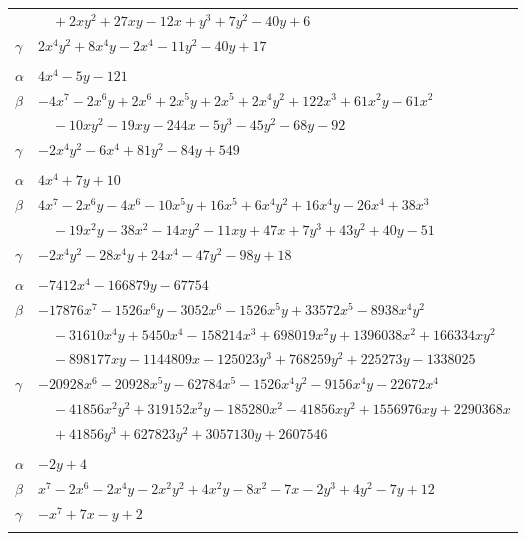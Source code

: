 \documentclass[11pt]{article}
\begin{document}
\begin{longtable}{@{}ll@{}}
 & $\quad +2xy^{2}+27xy-12x+y^{3}+7y^{2}-40y+6$\\
$\gamma$ & $2x^{4}y^{2}+8x^{4}y-2x^{4}-11y^{2}-40y+17$\\
\addlinespace[3pt]
\multicolumn{2}{@{}l}{$\{i,j\}=\{12,21\}$, $k_{ij}=2^{4}\cdot 3\cdot 7$}\\
$\alpha$ & $4x^{4}-5y-121$\\
$\beta$ & $-4x^{7}-2x^{6}y+2x^{6}+2x^{5}y+2x^{5}+2x^{4}y^{2}+122x^{3}+61x^{2}y-61x^{2}$\\
 & $\quad -10xy^{2}-19xy-244x-5y^{3}-45y^{2}-68y-92$\\
$\gamma$ & $-2x^{4}y^{2}-6x^{4}+81y^{2}-84y+549$\\
\addlinespace[3pt]
\multicolumn{2}{@{}l}{$\{i,j\}=\{13,17\}$, $k_{ij}=2^{4}\cdot 7$}\\
$\alpha$ & $4x^{4}+7y+10$\\
$\beta$ & $4x^{7}-2x^{6}y-4x^{6}-10x^{5}y+16x^{5}+6x^{4}y^{2}+16x^{4}y-26x^{4}+38x^{3}$\\
 & $\quad -19x^{2}y-38x^{2}-14xy^{2}-11xy+47x+7y^{3}+43y^{2}+40y-51$\\
$\gamma$ & $-2x^{4}y^{2}-28x^{4}y+24x^{4}-47y^{2}-98y+18$\\
\addlinespace[3pt]
\multicolumn{2}{@{}l}{$\{i,j\}=\{13,19\}$, $k_{ij}=2\cdot 3\cdot 5^{3}$}\\
$\alpha$ & $-7412x^{4}-166879y-67754$\\
$\beta$ & $-17876x^{7}-1526x^{6}y-3052x^{6}-1526x^{5}y+33572x^{5}-8938x^{4}y^{2}$\\
 & $\quad -31610x^{4}y+5450x^{4}-158214x^{3}+698019x^{2}y+1396038x^{2}+166334xy^{2}$\\
 & $\quad -898177xy-1144809x-125023y^{3}+768259y^{2}+225273y-1338025$\\
$\gamma$ & $-20928x^{6}-20928x^{5}y-62784x^{5}-1526x^{4}y^{2}-9156x^{4}y-22672x^{4}$\\
 & $\quad -41856x^{2}y^{2}+319152x^{2}y-185280x^{2}-41856xy^{2}+1556976xy+2290368x$\\
 & $\quad +41856y^{3}+627823y^{2}+3057130y+2607546$\\
\addlinespace[3pt]
\multicolumn{2}{@{}l}{$\{i,j\}=\{14,22\}$, $k_{ij}=2^{2}$}\\
$\alpha$ & $-2y+4$\\
$\beta$ & $x^{7}-2x^{6}-2x^{4}y-2x^{2}y^{2}+4x^{2}y-8x^{2}-7x-2y^{3}+4y^{2}-7y+12$\\
$\gamma$ & $-x^{7}+7x-y+2$\\
\addlinespace[3pt]
\multicolumn{2}{@{}l}{$\{i,j\}=\{14,29\}$, $k_{ij}=3\cdot 5\cdot 7$}\\

\end{longtable}
\end{document}
